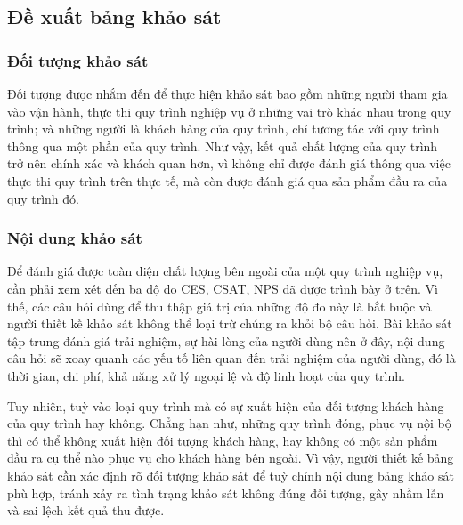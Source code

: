 \subsection{Đề xuất bảng khảo sát}
\subsubsection{Đối tượng khảo sát}

Đối tượng được nhắm đến để thực hiện khảo sát bao gồm những người tham gia vào vận hành, thực thi quy trình nghiệp vụ ở những vai trò khác nhau trong quy trình; và những người là khách hàng của quy trình, chỉ tương tác với quy trình thông qua một phần của quy trình. Như vậy, kết quả chất lượng của quy trình trở nên chính xác và khách quan hơn, vì không chỉ được đánh giá thông qua việc thực thi quy trình trên thực tế, mà còn được đánh giá qua sản phẩm đầu ra của quy trình đó.
\subsubsection{Nội dung khảo sát}

Để đánh giá được toàn diện chất lượng bên ngoài của một quy trình nghiệp vụ, cần phải xem xét đến ba độ đo CES, CSAT, NPS đã được trình bày ở trên. Vì thế, các câu hỏi dùng để thu thập giá trị của những độ đo này là bắt buộc và người thiết kế khảo sát không thể loại trừ chúng ra khỏi bộ câu hỏi. Bài khảo sát tập trung đánh giá trải nghiệm, sự hài lòng của người dùng nên ở đây, nội dung câu hỏi sẽ xoay quanh các yếu tố liên quan đến trải nghiệm của người dùng, đó là thời gian, chi phí, khả năng xử lý ngoại lệ và độ linh hoạt của quy trình.

\par
Tuy nhiên, tuỳ vào loại quy trình mà có sự xuất hiện của đối tượng khách hàng của quy trình hay không. Chẳng hạn như, những quy trình đóng, phục vụ nội bộ thì có thể không xuất hiện đối tượng khách hàng, hay không có một sản phẩm đầu ra cụ thể nào phục vụ cho khách hàng bên ngoài. Vì vậy, người thiết kế bảng khảo sát cần xác định rõ đối tượng khảo sát để tuỳ chỉnh nội dung bảng khảo sát phù hợp, tránh xảy ra tình trạng khảo sát không đúng đối tượng, gây nhầm lẫn và sai lệch kết quả thu được.

